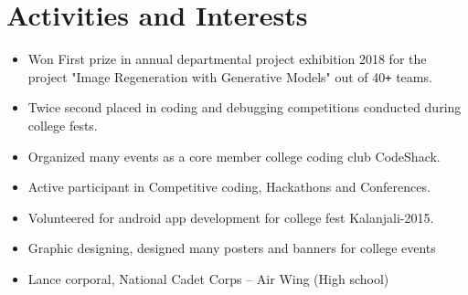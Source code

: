 \documentclass[10pt]{article}
\begin{document}
\section*{Activities and Interests}
\begin{itemize}
 \itemsep0em
 \item 
 Won First prize in annual departmental project exhibition 2018 for the project "Image Regeneration with Generative Models" out of 40\texttt{+} teams.
 \item 
 Twice second placed in coding and debugging competitions conducted during college fests.
 \item
 Organized many events as a core member college coding club CodeShack.
 \item
 Active participant in Competitive coding, Hackathons and Conferences.
 \item
 Volunteered for android app development for college fest Kalanjali-2015.
 \item
 Graphic designing, designed many posters and banners for college events
 \item
 Lance corporal, National Cadet Corps – Air Wing (High school)

\end{itemize}
\end{document}
